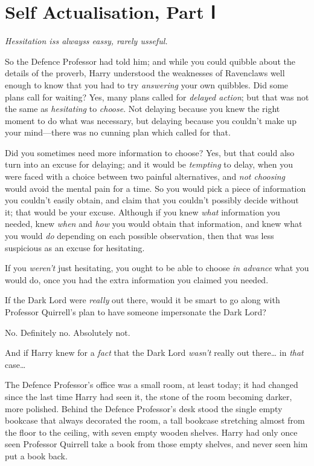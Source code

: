 \chapter{Self Actualisation, Part Ⅰ}

\emph{Hessitation iss alwayss eassy, rarely usseful.}

So the Defence Professor had told him; and while you could quibble about
the details of the proverb, Harry understood the weaknesses of
Ravenclaws well enough to know that you had to try \emph{answering} your
own quibbles. Did some plans call for waiting? Yes, many plans called
for \emph{delayed action}; but that was not the same as
\emph{hesitating} to \emph{choose}. Not delaying because you knew the
right moment to do what was necessary, but delaying because you couldn't
make up your mind---there was no cunning plan which called for that.

Did you sometimes need more information to choose? Yes, but that could
also turn into an excuse for delaying; and it would be \emph{tempting}
to delay, when you were faced with a choice between two painful
alternatives, and \emph{not choosing} would avoid the mental pain for a
time. So you would pick a piece of information you couldn't easily
obtain, and claim that you couldn't possibly decide without it; that
would be your excuse. Although if you knew \emph{what} information you
needed, knew \emph{when} and \emph{how} you would obtain that
information, and knew what you would \emph{do} depending on each
possible observation, then that was less suspicious as an excuse for
hesitating.

If you \emph{weren't} just hesitating, you ought to be able to choose
\emph{in advance} what you would do, once you had the extra information
you claimed you needed.

If the Dark Lord were \emph{really} out there, would it be smart to go
along with Professor Quirrell's plan to have someone impersonate the
Dark Lord?

No. Definitely no. Absolutely not.

And if Harry knew for a \emph{fact} that the Dark Lord \emph{wasn't}
really out there\ldots{} in \emph{that} case\ldots{}

The Defence Professor's office was a small room, at least today; it had
changed since the last time Harry had seen it, the stone of the room
becoming darker, more polished. Behind the Defence Professor's desk
stood the single empty bookcase that always decorated the room, a tall
bookcase stretching almost from the floor to the ceiling, with seven
empty wooden shelves. Harry had only once seen Professor Quirrell take a
book from those empty shelves, and never seen him put a book back.

